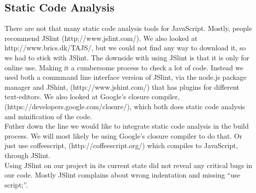 \subsection{Static Code Analysis} %
\label{sub:Static Code Analysis}
There are not that many static code analysis tools for JavaScript. Mostly, people recommend JSlint (http://www.jslint.com/). We also looked at http://www.brics.dk/TAJS/, but we could not find any way to download it, so we had to stick with JSlint. The downside with using JSlint is that it is only for online use. Making it a cumbersome process to check a lot of code.
Instead we used both a commmand line interface version of JSlint, via the node.js package manager and JShint, (http://www.jshint.com/) that has plugins for different text-editors. We also looked at Google's closure compiler, (https://developers.google.com/closure/), which both does static code analysis and minification of the code.\\
Futher down the line we would like to integrate static code analysis in the build process. We will most likely be using Google's closure compiler to do that. Or just use coffeescript, (http://coffeescript.org/) which compiles to JavaScript, through JSlint.\\
Using JSlint on our project in its current state did not reveal any critical bugs in our code. Mostly JSlint complains about wrong indentation and missing ``use script;''.

